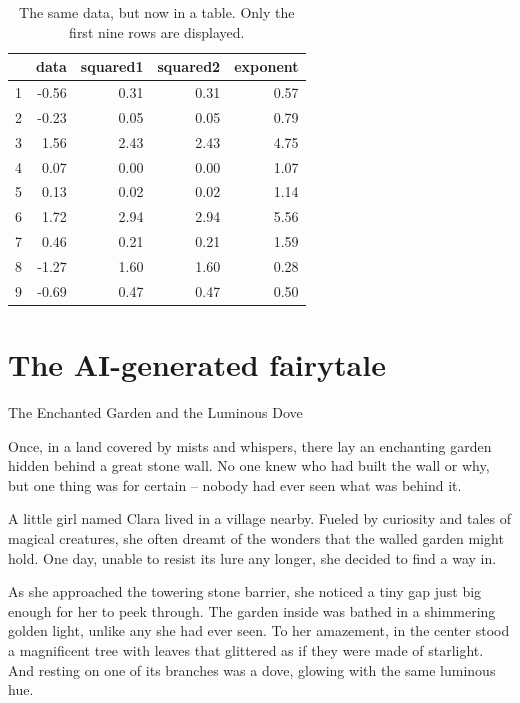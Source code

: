 \documentclass[10pt, a4paper, titlepage]{article}
\begin{document}
\begin{table}[ht]
\centering
\caption{The same data, but now in a table. Only the first nine rows 
are displayed.}
\begin{tabular}{rrrrr}
  \hline
 & data & squared1 & squared2 & exponent \\ 
  \hline
1 & -0.56 & 0.31 & 0.31 & 0.57 \\ 
  2 & -0.23 & 0.05 & 0.05 & 0.79 \\ 
  3 & 1.56 & 2.43 & 2.43 & 4.75 \\ 
  4 & 0.07 & 0.00 & 0.00 & 1.07 \\ 
  5 & 0.13 & 0.02 & 0.02 & 1.14 \\ 
  6 & 1.72 & 2.94 & 2.94 & 5.56 \\ 
  7 & 0.46 & 0.21 & 0.21 & 1.59 \\ 
  8 & -1.27 & 1.60 & 1.60 & 0.28 \\ 
  9 & -0.69 & 0.47 & 0.47 & 0.50 \\ 
   \hline
\end{tabular}
\end{table}

\section*{The AI-generated fairytale}

The Enchanted Garden and the Luminous Dove

Once, in a land covered by mists and whispers, there lay an enchanting garden hidden behind a great stone wall. No one knew who had built the wall or why, but one thing was for certain – nobody had ever seen what was behind it.

A little girl named Clara lived in a village nearby. Fueled by curiosity and tales of magical creatures, she often dreamt of the wonders that the walled garden might hold. One day, unable to resist its lure any longer, she decided to find a way in.

As she approached the towering stone barrier, she noticed a tiny gap just big enough for her to peek through. The garden inside was bathed in a shimmering golden light, unlike any she had ever seen. To her amazement, in the center stood a magnificent tree with leaves that glittered as if they were made of starlight. And resting on one of its branches was a dove, glowing with the same luminous hue.
\end{document}
